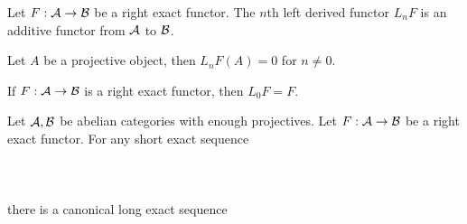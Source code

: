 \documentclass[a4paper]{article}
\begin{document}
\begin{prp}{}{} Let $F:\mathcal{A}\to\mathcal{B}$ be a right exact functor. The $n$th left derived functor $L_nF$ is an additive functor from $\mathcal{A}$ to $\mathcal{B}$. 
\end{prp}

\begin{lmm}{}{} Let $A$ be a projective object, then $L_nF(A)=0$ for $n\neq 0$. 
\end{lmm}

\begin{crl}{}{} If $F:\mathcal{A}\to\mathcal{B}$ is a right exact functor, then $L_0F=F$. 
\end{crl}

\begin{thm}{}{} Let $\mathcal{A},\mathcal{B}$ be abelian categories with enough projectives. Let $F:\mathcal{A}\to\mathcal{B}$ be a right exact functor. For any short exact sequence \\~\\
\\~\\
there is a canonical long exact sequence \\~\\
\\~\\
\end{thm}
\end{document}
